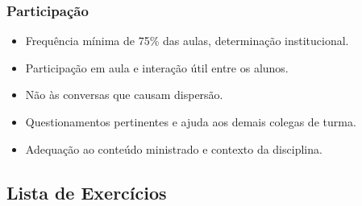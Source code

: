 \begin{frame}[t]\frametitle{Participação}

  \begin{itemize}
    \justifying{}
    \setlength\itemsep{1em}
    \item Frequência mínima de 75\% das aulas, determinação institucional.
    \item Participação em aula e interação útil entre os alunos.
    \item Não às conversas que causam dispersão.
    \item Questionamentos pertinentes e ajuda aos demais colegas de turma.
    \item Adequação ao conteúdo ministrado e contexto da disciplina.
  \end{itemize}

\end{frame}



\subsection[Lista de Exercícios]{Lista de Exercícios}\label{subsec:planejamento-lista}



